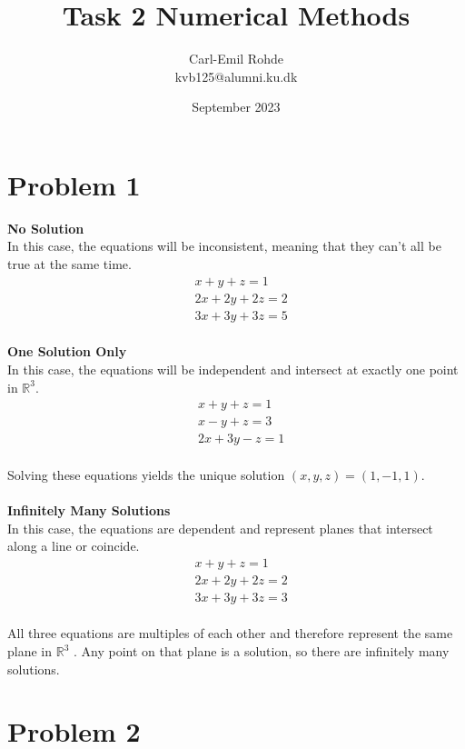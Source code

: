 \documentclass[manuscript,screen,review]{acmart}
\begin{document}
\title{Task 2  Numerical Methods}
\author{Carl-Emil Rohde \\ kvb125@alumni.ku.dk}
\date{September 2023}

\maketitle

\section*{Problem 1}

\textbf{No Solution}
\\
In this case, the equations will be inconsistent, meaning that they can't all be true at the same time.
\\
$$
\begin{aligned}
& x+y+z=1 \\
& 2 x+2 y+2 z=2 \\
& 3 x+3 y+3 z=5
\end{aligned}
$$
\\
\textbf{One Solution Only}
\\
In this case, the equations will be independent and intersect at exactly one point in $\mathbb{R}^3$.
\\
$$
\begin{aligned}
& x+y+z=1 \\
& x-y+z=3 \\
& 2 x+3 y-z=1
\end{aligned}
$$
\\
Solving these equations yields the unique solution $(x, y, z)=(1,-1,1)$.
\\
\\
\textbf{Infinitely Many Solutions}
\\
In this case, the equations are dependent and represent planes that intersect along a line or coincide.
\\
$$
\begin{aligned}
& x+y+z=1 \\
& 2 x+2 y+2 z=2 \\
& 3 x+3 y+3 z=3
\end{aligned}
$$
\\
All three equations are multiples of each other and therefore represent the same plane in $\mathbb{R}^3$ . Any point on that plane is a solution, so there are infinitely many solutions.
\section*{Problem 2}
\end{document}
